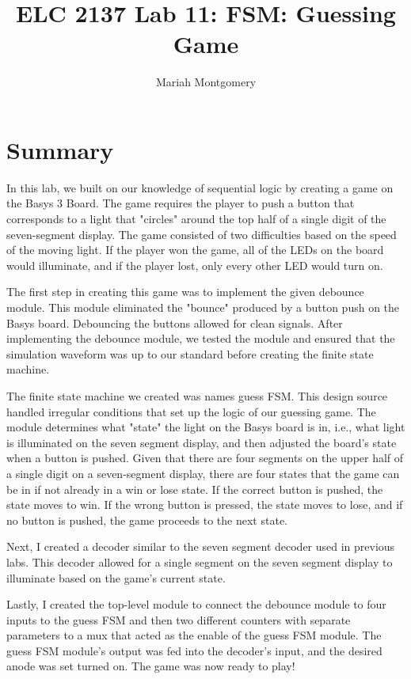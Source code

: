 \documentclass[11pt]{article}
\begin{document}
\title{ELC 2137 Lab 11: FSM: Guessing Game}
\author{Mariah Montgomery}

\maketitle


\section*{Summary}

In this lab, we built on our knowledge of sequential logic by creating a game on the Basys 3 Board. The game requires the player to push a button that corresponds to a light that "circles" around the top half of a single digit of the seven-segment display. The game consisted of two difficulties based on the speed of the moving light. If the player won the game, all of the LEDs on the board would illuminate, and if the player lost, only every other LED would turn on.

The first step in creating this game was to implement the given debounce module. This module eliminated the "bounce" produced by a button push on the Basys board. Debouncing the buttons allowed for clean signals. After implementing the debounce module, we tested the module and ensured that the simulation waveform was up to our standard before creating the finite state machine.  

The finite state machine we created was names guess FSM. This design source handled irregular conditions that set up the logic of our guessing game. The module determines what "state" the light on the Basys board is in, i.e., what light is illuminated on the seven segment display, and then adjusted the board's state when a button is pushed. Given that there are four segments on the upper half of a single digit on a seven-segment display, there are four states that the game can be in if not already in a win or lose state. If the correct button is pushed, the state moves to win. If the wrong button is pressed, the state moves to lose, and if no button is pushed,  the game proceeds to the next state. 

Next, I created a decoder similar to the seven segment decoder used in previous labs. This decoder allowed for a single segment on the seven segment display to illuminate based on the game's current state.  

Lastly, I created the top-level module to connect the debounce module to four inputs to the guess FSM and then two different counters with separate parameters to a mux that acted as the enable of the guess FSM module. The guess FSM module's output was fed into the decoder's input, and the desired anode was set turned on. The game was now ready to play! 
\end{document}
